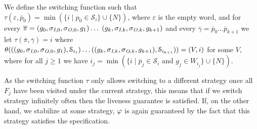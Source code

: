 We define the switching function such that 
$\tau (\varepsilon,\overline p_0) = \min(\{i \mid p_0 \in \mathcal S_i\}\cup \{N\})$, where $\varepsilon$ is the empty word, and for every 
$\overline \pi =(g_0,\sigma_{\textit{I},0},\sigma_{\textit{O},0}, g_1) \ldots$ $
(g_k,\sigma_{\textit{I},k}, \sigma_{\textit{O},k}, g_{k+1})$ and every $\overline \gamma = \overline p_0\ldots\overline p_{k+1}$ we let
$\tau (\overline \pi, \overline\gamma) = i$ where \newline
$\theta(((g_0,\sigma_{\textit{I},0},\sigma_{\textit{O},0}, g_1),\mathcal S_{i_1}) \ldots
((g_k,\sigma_{\textit{I},k}, \sigma_{\textit{O},k}, g_{k+1}),\mathcal S_{i_{k+1}})) = (V,i)$ for some $V$, where for all $j\geq 1$ we have $i_j  = \min(\{i \mid \overline p_j \in \mathcal S_i\text{ and }g_j \in W_{i_j}\} \cup \{N\})$.

As the switching function $\tau$ only allows switching to a different strategy once all $F_j$ have been visited under the current strategy, this means that if we switch strategy infinitely often then the liveness guarantee is satisfied. If, on the other hand, we stabilize at some strategy, $\varphi$ is again guaranteed by the fact that this strategy satisfies the specification. 
